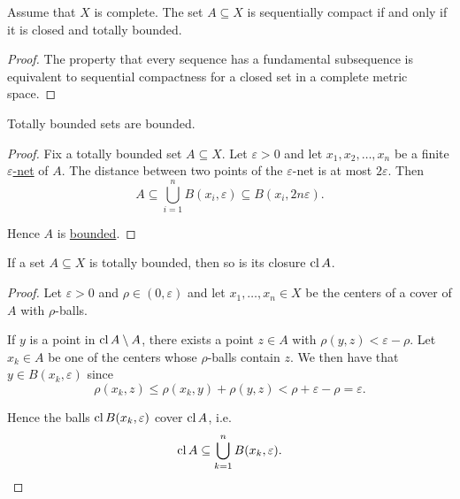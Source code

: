 \begin{Corollary}\label{thm:metric_space_compact_iff_closed_totally_bounded}
  Assume that \( X \) is complete. The set \( A \subseteq X \) is sequentially compact if and only if it is closed and totally bounded.
\end{Corollary}
\begin{proof}
  The property that every sequence has a fundamental subsequence is equivalent to sequential compactness for a closed set in a complete metric space.
\end{proof}

\begin{Proposition}\label{thm:totally_bounded_sets_are_bounded}
  Totally bounded sets are bounded.
\end{Proposition}
\begin{proof}
  Fix a totally bounded set \( A \subseteq X \). Let \( \varepsilon > 0 \) and let \( x_1, x_2, \ldots, x_n \) be a finite \hyperref[def:totally_bounded_set/epsilon_net]{\( \varepsilon \)-net} of \( A \). The distance between two points of the \( \varepsilon \)-net is at most \( 2\varepsilon \). Then
  \begin{equation*}
    A \subseteq \bigcup_{i=1}^n B(x_i, \varepsilon) \subseteq B(x_i, 2 n \varepsilon).
  \end{equation*}

  Hence \( A \) is \hyperref[def:metric_space/bounded_set]{bounded}.
\end{proof}

\begin{Proposition}\label{thm:closure_of_totally_bounded_is_totally_bounded}
  If a set \( A \subseteq X \) is totally bounded, then so is its closure \( \operatorname{cl} A \).
\end{Proposition}
\begin{proof}
  Let \( \varepsilon > 0 \) and \( \rho \in (0, \varepsilon) \) and let \( x_1, \ldots, x_n \in X \) be the centers of a cover of \( A \) with \( \rho \)-balls.

  If \( y \) is a point in \( \operatorname{cl} A \setminus A \), there exists a point \( z \in A \) with \( \rho(y, z) < \varepsilon - \rho \). Let \( x_k \in A \) be one of the centers whose \( \rho \)-balls contain \( z \). We then have that \( y \in B(x_k, \varepsilon) \) since
  \begin{equation*}
    \rho(x_k, z) \leq \rho(x_k, y) + \rho(y, z) < \rho + \varepsilon - \rho = \varepsilon.
  \end{equation*}

  Hence the balls \( \operatorname{cl} B(x_k, \varepsilon) \) cover \( \operatorname{cl} A \), i.e.
  \begin{equation*}
    \operatorname{cl} A \subseteq \bigcup_{k=1}^n B(x_k, \varepsilon).
  \end{equation*}
\end{proof}

